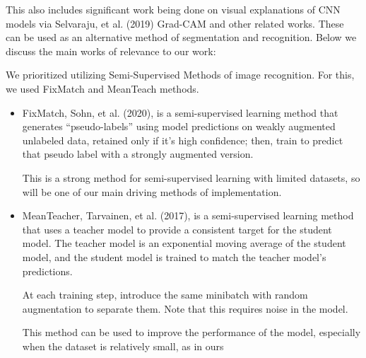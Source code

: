\documentclass{article}
\begin{document}
This also includes significant work being done on visual explanations of CNN models via Selvaraju, et al.\cite{selvaraju} (2019) Grad-CAM and other related works. These can be used as an alternative method of segmentation and recognition. Below we discuss the main works of relevance to our work:

We prioritized utilizing Semi-Supervised Methods of image recognition. For this, we used FixMatch and MeanTeach methods. 

\begin{itemize}
    \item FixMatch, Sohn, et al.\cite{sohn} (2020), is a semi-supervised learning method that generates “pseudo-labels” using model predictions on weakly augmented unlabeled data, retained only if it’s high confidence; then, train to predict that pseudo label with a strongly augmented version.

    This is a strong method for semi-supervised learning with limited datasets, so will be one of our main driving methods of implementation.
    \item MeanTeacher, Tarvainen, et al.\cite{tarvainen} (2017), is a semi-supervised learning method that uses a teacher model to provide a consistent target for the student model. The teacher model is an exponential moving average of the student model, and the student model is trained to match the teacher model’s predictions.

    At each training step, introduce the same minibatch with random augmentation to separate them. Note that this requires noise in the model. 

    This method can be used to improve the performance of the model, especially when the dataset is relatively small, as in ours
\end{itemize}

\end{document}
